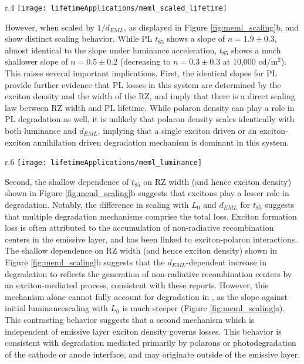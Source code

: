 \documentclass[../thesis.tex]{subfiles}
\begin{document}
\begin{wrapfigure}{r}{.4\textwidth}
\centering
\texttt{[image: lifetimeApplications/meml\_scaled\_lifetime]}
\caption{Lifetimes of devices with luminance scaled to match the EML thickness. PL collapses due to matched exciton density.}
\label{fig:meml_scaled_lifetime}
\end{wrapfigure}
However, when scaled by $1/d_{EML}$, as displayed in Figure \ref{fig:meml_scaling}b, \ef and \pl show distinct scaling behavior. 
While PL $t_{85}$ shows a slope of $n = 1.9\pm0.3$, almost identical to the slope under luminance acceleration, \ef $t_{85}$ shows a much shallower slope of $n = 0.5\pm0.2$ (decreasing to $n = 0.3\pm0.3$ at 10,000 cd/m$^2$). 
This raises several important implications.
First, the identical slopes for PL provide further evidence that PL losses in this system are determined by the exciton density and the width of the RZ, and imply that there is a direct scaling law between RZ width and PL lifetime. 
While polaron density can play a role in PL degradation as well, it is unlikely that polaron density scales identically with both luminance and $d_{EML}$, implying that a single exciton driven or an exciton-exciton annihilation driven degradation mechanism is dominant in this system.

\begin{wrapfigure}{r}{.6\textwidth}
\centering
\texttt{[image: lifetimeApplications/meml\_luminance]}
\caption{Scaling behavior of \pl and \ef as a function of (a) luminance and (b) exciton density.}
\label{fig:meml_scaling}
\end{wrapfigure}

Second, the shallow dependence of \ef $t_{85}$ on RZ width (and hence exciton density) shown in Figure \ref{fig:meml_scaling}b suggests that excitons play a lesser role in \ef degradation. 
Notably, the difference in scaling with $L_0$ and $d_{EML}$ for \ef $t_{85}$ suggests that multiple degradation mechanisms comprise the total \ef loss.  
Exciton formation loss is often attributed to the accumulation of non-radiative recombination centers in the emissive layer,\supercite{Kondakov2003,Kondakov2007d} and has been linked to exciton-polaron interactions.\supercite{Zhang2017a}
The shallow dependence on RZ width (and hence exciton density) shown in Figure \ref{fig:meml_scaling}b suggests that the $d_{EML}$-dependent increase in \ef degradation to reflects the generation of non-radiative recombination centers by an exciton-mediated process, consistent with these reports. 
However, this mechanism alone cannot fully account for degradation in \ef, as the slope against initial luminancescaling with $L_0$ is much steeper (Figure \ref{fig:meml_scaling}a). 
This contrasting behavior suggests that a second mechanism which is independent of emissive layer exciton density governs \ef losses. 
This behavior is consistent with degradation mediated primarily by polarons or photodegradation of the cathode or anode interface, and may originate outside of the emissive layer. \supercite{Wang2012,Wang2010a}
\end{document}
